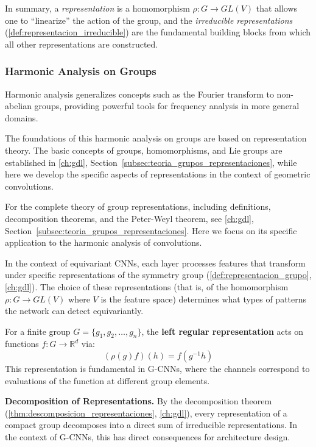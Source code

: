 In summary, a \textit{representation} is a homomorphism $\rho: G \to GL(V)$ that allows one to ``linearize'' the action of the group, and the \textit{irreducible representations} (\autoref{def:representacion_irreducible}) are the fundamental building blocks from which all other representations are constructed.

\subsubsection{Harmonic Analysis on Groups}

Harmonic analysis generalizes concepts such as the Fourier transform to non-abelian groups, providing powerful tools for frequency analysis in more general domains.

The foundations of this harmonic analysis on groups are based on representation theory. The basic concepts of groups, homomorphisms, and Lie groups are established in \autoref{ch:gdl}, Section~\ref{subsec:teoria_grupos_representaciones}, while here we develop the specific aspects of representations in the context of geometric convolutions.

For the complete theory of group representations, including definitions, decomposition theorems, and the Peter-Weyl theorem, see \autoref{ch:gdl}, Section~\ref{subsec:teoria_grupos_representaciones}. Here we focus on its specific application to the harmonic analysis of convolutions.

In the context of equivariant \glspl{CNN}, each layer processes features that transform under specific representations of the symmetry group (\autoref{def:representacion_grupo}, \autoref{ch:gdl}). The choice of these representations (that is, of the homomorphism $\rho: G \to GL(V)$ where $V$ is the feature space) determines what types of patterns the network can detect equivariantly.

\begin{example}\label{ex:representacion_regular_cnn}
For a finite group $G = \{g_1, g_2, \ldots, g_n\}$, the \textbf{left regular representation} acts on functions $f: G \rightarrow \mathbb{R}^d$ via:
\begin{equation}
(\rho(g)f)(h) = f(g^{-1}h)
\end{equation}
This representation is fundamental in G-\glspl{CNN}, where the channels correspond to evaluations of the function at different group elements.
\end{example}

\textbf{Decomposition of Representations.} By the decomposition theorem (\autoref{thm:descomposicion_representaciones}, \autoref{ch:gdl}), every representation of a compact group decomposes into a direct sum of irreducible representations. In the context of G-\glspl{CNN}, this has direct consequences for architecture design.

